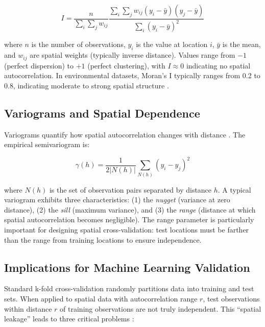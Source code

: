 \documentclass[a4paper,fleqn]{cas-sc}
\begin{document}
\begin{equation}
I = \frac{n}{\sum_{i}\sum_{j} w_{ij}} \frac{\sum_{i}\sum_{j} w_{ij}(y_i - \bar{y})(y_j - \bar{y})}{\sum_{i}(y_i - \bar{y})^2}
\end{equation}

where $n$ is the number of observations, $y_i$ is the value at location $i$, $\bar{y}$ is the mean, and $w_{ij}$ are spatial weights (typically inverse distance). Values range from $-1$ (perfect dispersion) to $+1$ (perfect clustering), with $I \approx 0$ indicating no spatial autocorrelation. In environmental datasets, Moran's I typically ranges from 0.2 to 0.8, indicating moderate to strong spatial structure \citep{goovaerts1997geostatistics}.

\subsection{Variograms and Spatial Dependence}

Variograms quantify how spatial autocorrelation changes with distance \citep{matheron1963principles}. The empirical semivariogram is:

\begin{equation}
\gamma(h) = \frac{1}{2|N(h)|} \sum_{N(h)} (y_i - y_j)^2
\end{equation}

where $N(h)$ is the set of observation pairs separated by distance $h$. A typical variogram exhibits three characteristics: (1) the \textit{nugget} (variance at zero distance), (2) the \textit{sill} (maximum variance), and (3) the \textit{range} (distance at which spatial autocorrelation becomes negligible). The range parameter is particularly important for designing spatial cross-validation: test locations must be farther than the range from training locations to ensure independence.

\subsection{Implications for Machine Learning Validation}

Standard k-fold cross-validation randomly partitions data into training and test sets. When applied to spatial data with autocorrelation range $r$, test observations within distance $r$ of training observations are not truly independent. This ``spatial leakage'' leads to three critical problems \citep{roberts2017cross}:
\end{document}
